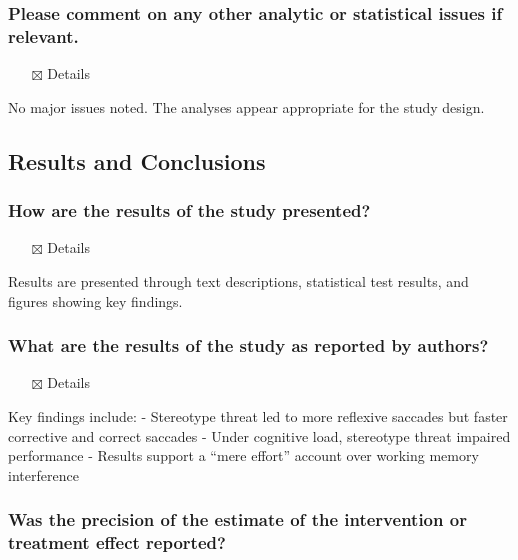 \documentclass[
  doc, a4paper]{apa7}
\providecommand{\tightlist}{%
  \setlength{\itemsep}{0pt}\setlength{\parskip}{0pt}}
\begin{document}
\subsubsection{Please comment on any other analytic or statistical issues if relevant.}\label{please-comment-on-any-other-analytic-or-statistical-issues-if-relevant.}

\begin{itemize}
\tightlist
\item[$\boxtimes$]
  Details
\end{itemize}

No major issues noted. The analyses appear appropriate for the study design.

\subsection{Results and Conclusions}\label{results-and-conclusions}

\subsubsection{How are the results of the study presented?}\label{how-are-the-results-of-the-study-presented}

\begin{itemize}
\tightlist
\item[$\boxtimes$]
  Details
\end{itemize}

Results are presented through text descriptions, statistical test results, and figures showing key findings.

\subsubsection{What are the results of the study as reported by authors?}\label{what-are-the-results-of-the-study-as-reported-by-authors}

\begin{itemize}
\tightlist
\item[$\boxtimes$]
  Details
\end{itemize}

Key findings include:
- Stereotype threat led to more reflexive saccades but faster corrective and correct saccades
- Under cognitive load, stereotype threat impaired performance
- Results support a ``mere effort'' account over working memory interference

\subsubsection{Was the precision of the estimate of the intervention or treatment effect reported?}\label{was-the-precision-of-the-estimate-of-the-intervention-or-treatment-effect-reported}
\end{document}
